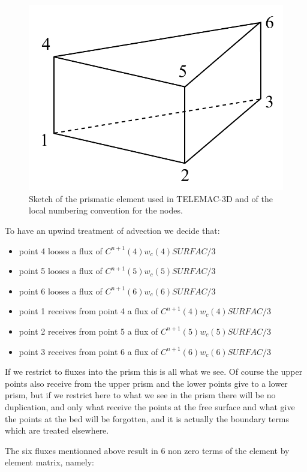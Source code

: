 \begin{figure}[h]%
\centering
\includegraphics[scale=0.5]{graphics/prism_numbering.pdf}
\caption{Sketch of the prismatic element used in TELEMAC-3D and of the local numbering convention for the nodes.}
\label{schema prisme}%
\end{figure}

To have an upwind treatment of advection we decide that:
\begin{itemize}
\item point 4 looses a flux of $C^{n+1}(4)w_{c}(4)SURFAC/3$
\item point 5 looses a flux of $C^{n+1}(5)w_{c}(5)SURFAC/3$
\item point 6 looses a flux of $C^{n+1}(6)w_{c}(6)SURFAC/3$
\item point 1 receives from point 4 a flux of $C^{n+1}(4)w_{c}(4)SURFAC/3$
\item point 2 receives from point 5 a flux of $C^{n+1}(5)w_{c}(5)SURFAC/3$
\item point 3 receives from point 6 a flux of $C^{n+1}(6)w_{c}(6)SURFAC/3$
\end{itemize}
If we restrict to fluxes into the prism this is all what we see. Of course the
upper points also receive from the upper prism and the lower points give to a
lower prism, but if we restrict here to what we see in the prism there will be
no duplication, and only what receive the points at the free surface and what
give the points at the bed will be forgotten, and it is actually the
boundary terms which are treated elsewhere.

The six fluxes mentionned above result in 6 non zero terms of the element by
element matrix, namely:

